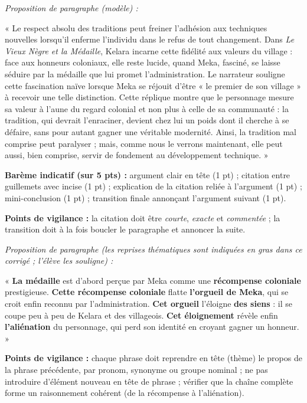 \documentclass[11pt]{article}
\begin{document}
\begin{corrige}
\emph{Proposition de paragraphe (modèle) :}

« Le respect absolu des traditions peut freiner l'adhésion aux techniques nouvelles lorsqu'il enferme l'individu dans le refus de tout changement. Dans \emph{Le Vieux Nègre et la Médaille}, Kelara incarne cette fidélité aux valeurs du village : face aux honneurs coloniaux, elle reste lucide, quand Meka, fasciné, se laisse séduire par la médaille que lui promet l'administration. Le narrateur souligne cette fascination naïve lorsque Meka se réjouit d'être « le premier de son village » à recevoir une telle distinction. Cette réplique montre que le personnage mesure sa valeur à l'aune du regard colonial et non plus à celle de sa communauté : la tradition, qui devrait l'enraciner, devient chez lui un poids dont il cherche à se défaire, sans pour autant gagner une véritable modernité. Ainsi, la tradition mal comprise peut paralyser ; mais, comme nous le verrons maintenant, elle peut aussi, bien comprise, servir de fondement au développement technique. »

\textbf{Barème indicatif (sur 5 pts) :} argument clair en tête (1 pt) ; citation entre guillemets avec incise (1 pt) ; explication de la citation reliée à l'argument (1 pt) ; mini-conclusion (1 pt) ; transition finale annonçant l'argument suivant (1 pt).

\textbf{Points de vigilance :} la citation doit être \emph{courte}, \emph{exacte} et \emph{commentée} ; la transition doit à la fois boucler le paragraphe et annoncer la suite.
\end{corrige}

\begin{corrige}
\emph{Proposition de paragraphe (les reprises thématiques sont indiquées en gras dans ce corrigé ; l'élève les souligne) :}

« \textbf{La médaille} est d'abord perçue par Meka comme une \textbf{récompense coloniale} prestigieuse. \textbf{Cette récompense coloniale} flatte \textbf{l'orgueil de Meka}, qui se croit enfin reconnu par l'administration. \textbf{Cet orgueil} l'éloigne \textbf{des siens} : il se coupe peu à peu de Kelara et des villageois. \textbf{Cet éloignement} révèle enfin \textbf{l'aliénation} du personnage, qui perd son identité en croyant gagner un honneur. »

\textbf{Points de vigilance :} chaque phrase doit reprendre en tête (thème) le propos de la phrase précédente, par pronom, synonyme ou groupe nominal ; ne pas introduire d'élément nouveau en tête de phrase ; vérifier que la chaîne complète forme un raisonnement cohérent (de la récompense à l'aliénation).
\end{corrige}
\end{document}
